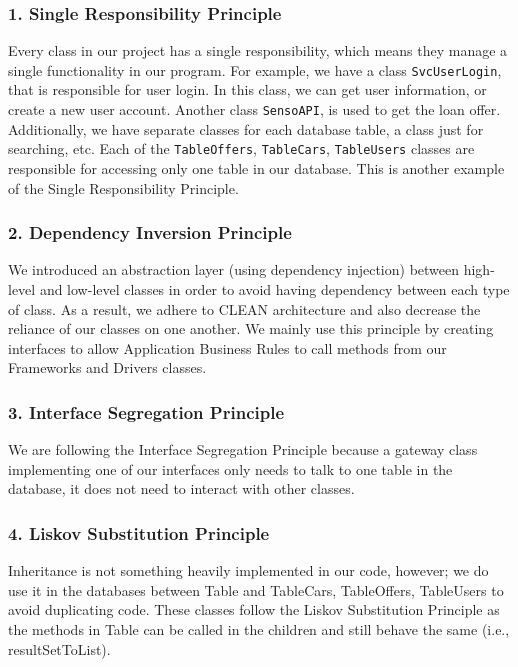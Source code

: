 \documentclass[fontsize=14pt]{article}
\def\code#1{\texttt{#1}}
\begin{document}
\subsubsection*{1. Single Responsibility Principle}

Every class in our project has a single responsibility, which means they manage a single functionality in our program. For example, we have a class \texttt{SvcUserLogin}, that is responsible for user login. In this class, we can get user information, or create a new user account. Another class \texttt{SensoAPI}, is used to get the loan offer. Additionally, we have separate classes for each database table, a class just for searching, etc. Each of the \code{TableOffers}, \code{TableCars}, \code{TableUsers} classes are responsible for accessing only one table in our database. This is another example of the Single Responsibility Principle.

\subsubsection*{2. Dependency Inversion Principle}

We introduced an abstraction layer (using dependency injection) between high-level and low-level classes in order to avoid having dependency between each type of class. As a result, we adhere to CLEAN architecture and also decrease the reliance of our classes on one another. We mainly use this principle by creating interfaces to allow Application Business Rules to call methods from our Frameworks and Drivers classes.

\subsubsection*{3. Interface Segregation Principle} 
We are following the Interface Segregation Principle because a gateway class implementing one of our interfaces only needs to talk to one table in the database, it does not need to interact with other classes.

\subsubsection*{4. Liskov Substitution Principle}
Inheritance is not something heavily implemented in our code, however; we do use it in the databases between Table and TableCars, TableOffers, TableUsers to avoid duplicating code. These classes follow the Liskov Substitution Principle as the methods in Table can be called in the children and still behave the same (i.e., resultSetToList). 
 
\end{document}
